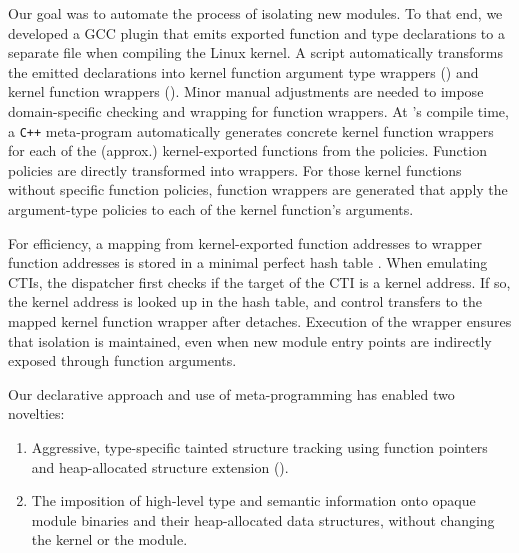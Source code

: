 \documentclass[10pt,preprint]{sigplanconf}
\begin{document}
Our goal was to automate the process of isolating new modules. To that end, we developed a GCC plugin that emits exported function and type declarations to a separate file when compiling the Linux kernel. A script automatically transforms the emitted declarations into kernel function argument type wrappers () and kernel function wrappers (). Minor manual adjustments are needed to impose domain-specific checking and wrapping for function wrappers. At {\sysname}'s compile time, a \texttt{C++} meta-program automatically generates concrete kernel function wrappers for each of the (approx.)  kernel-exported functions from the policies. Function policies are directly transformed into wrappers. For those kernel functions without specific function policies, function wrappers are generated that apply the argument-type policies to each of the kernel function's arguments.

For efficiency, a mapping from kernel-exported function addresses to wrapper function addresses is stored in a minimal perfect hash table \cite{Belazzougui_Botelho_2008}. When emulating CTIs, the {\sysname} dispatcher first checks if the target of the CTI is a kernel address. If so, the kernel address is looked up in the hash table, and control transfers to the mapped kernel function wrapper after {\sysname} detaches. Execution of the wrapper ensures that isolation is maintained, even when new module entry points are indirectly exposed through function arguments.

Our declarative approach and use of meta-programming has enabled two novelties:
\begin{enumerate}
	\item Aggressive, type-specific tainted structure tracking using function pointers and heap-allocated structure extension ().
	\item The imposition of high-level type and semantic information onto opaque module binaries and their heap-allocated data structures, without changing the kernel or the module.
\end{enumerate}

\end{document}
